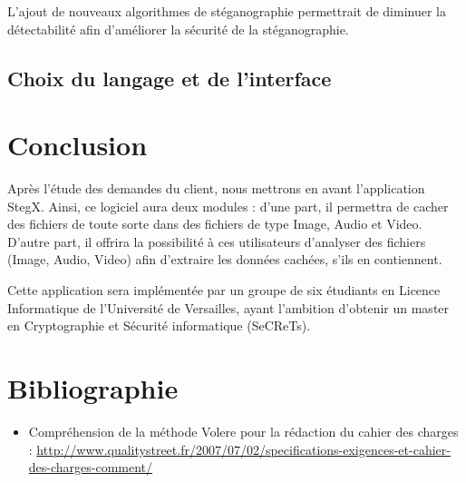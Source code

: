 \documentclass[11pt]{article}
\begin{document}
L'ajout de nouveaux algorithmes de stéganographie permettrait de diminuer la détectabilité afin d'améliorer la sécurité de la stéganographie. 

\subsection{Choix du langage et de l'interface}

\section{Conclusion}
Après l'étude des demandes du client, nous mettrons en avant l'application StegX. Ainsi, ce logiciel aura deux modules : d'une part, il permettra de cacher des fichiers de toute sorte dans 
des fichiers de type Image, Audio et Video. D'autre part, il offrira la possibilité à ces utilisateurs d'analyser des fichiers (Image, Audio, Video) afin d'extraire les données cachées, s'ils en 
contiennent. 

Cette application sera implémentée par un groupe de six étudiants en Licence Informatique de l'Université de Versailles, ayant l'ambition d'obtenir un master en Cryptographie et Sécurité informatique (SeCReTs). 

\newpage
\section{Bibliographie}
\begin {itemize}
\item Compréhension de la méthode Volere pour la rédaction du cahier des charges : \url{http://www.qualitystreet.fr/2007/07/02/specifications-exigences-et-cahier-des-charges-comment/}
\end{itemize}
\end{document}
